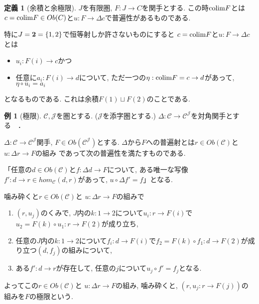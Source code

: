 \documentclass[dvipdfmx,a4paper,11pt]{report}
\newcommand{\colim}{{\rm colim}}
\theoremstyle{definition}
\newtheorem{dfn}[thm]{定義}
\newtheorem{exa}[thm]{例}
\begin{document}
 \begin{tcolorbox}
 [colback = white, colframe = green!35!black, fonttitle = \bfseries,breakable = true]
\begin{dfn}[余積と余極限]
$J$を有限圏, $F : J \to C$を関手とする.
この時$\colim F$とは$c = \colim F \in Ob(C)$と$u : F \to \Delta c$で普遍性があるものである. 

特に$J = {\bf 2} =\{ 1,2\}$で恒等射しか許さないものにすると
$c=\colim F $と$u : F \to \Delta c$とは
\begin{itemize}
\item $u_i : F(i) \to c$かつ
\item 任意に$a_i : F(i) \to d$について, ただ一つの$\eta : \colim F = c \to d$があって, $\eta \circ u_i = a_i$
\end{itemize}
となるものである. これは余積$F(1) \sqcup F(2)$のことである. 
\end{dfn}
 \end{tcolorbox}

\begin{exa}[極限]
$\mathcal{C}, \mathcal{J}$を圏とする. ($\mathcal{J}$を添字圏とする.)
$\Delta : \mathcal{C} \to \mathcal{C}^{\mathcal{J}}$を対角関手とする　．

$\Delta : \mathcal{C} \to \mathcal{C}^{\mathcal{J}}$関手, 
$F \in Ob(\mathcal{C}^{\mathcal{J}})$とする.
$\Delta $から$F$への普遍射とは$r \in Ob(\mathcal{C})$と $u: \Delta r \to F$の組み
であって次の普遍性を満たすものである.

「任意の$d \in Ob(\mathcal{C})$と$f :\Delta d \to F$について, ある唯一な写像$f' : d \to r \in hom_{\mathcal{C}}(d,r)$があって, $u \circ \Delta f'  =f$」となる.


噛み砕くと$r \in Ob(\mathcal{C})$と $u: \Delta r \to F $の組みで
\begin{enumerate}
\item $(r, u_j)$のくみで, $J$内の$k : 1\to 2$について$u_i : r \to F(i) $で$ u_2  = F(k) \circ u_1 : r \to F(2)$が成り立ち, 
\item 任意の$J$内の$k : 1\to 2$について$f_i : d \to F(i) $で$f_2  =  F(k)\circ f_1 : d \to F(2) $が成り立つ$(d, f_j)$の組みについて,
\item ある$f' : d \to r$が存在して, 任意の$j$について$ u_j \circ f' = f_j$となる.
\end{enumerate}
よってこの$r \in Ob(\mathcal{C})$と $u: \Delta r \to F$の組み, 噛み砕くと,
$(r, u_j : r \to F(j))$の組みを$F$の極限という. 
\end{exa}
\end{document}
